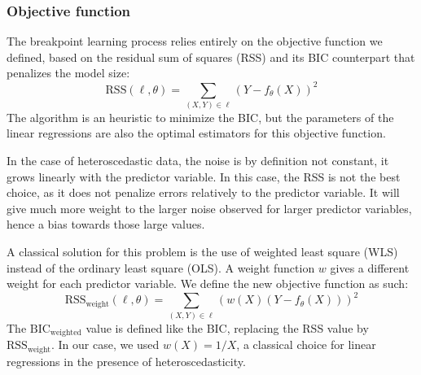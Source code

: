                 \pagebreak

            \subsubsection{Objective function}%
                The breakpoint learning process relies entirely on the objective function we defined, based on the
                residual sum of squares (RSS) and its BIC counterpart that penalizes the model size:
                \begin{equation}
                    \text{RSS}(\ell, \theta) = \sum_{(X,Y)\in\ell} (Y-f_\theta(X))^2
                \end{equation}
                The algorithm is an heuristic to minimize the BIC, but the parameters of the linear regressions are
                also the optimal estimators for this objective function.

                In the case of heteroscedastic data, the noise is by definition not constant, it grows linearly with the
                predictor variable. In this case, the RSS is not the best choice, as it does not penalize errors
                relatively to the predictor variable. It will give much more weight to the larger noise observed for
                larger predictor variables, hence a bias towards those large values.

                A classical solution for this problem is the use of weighted least square (WLS) instead of the ordinary
                least square (OLS). A weight function \(w\) gives a different weight for each predictor variable. We
                define the new objective function as such:
                \begin{equation}
                    \text{RSS}_\text{weight}(\ell,\theta) = \sum_{(X,Y)\in\ell} (w(X)(Y - f_\theta(X)))^2
                \end{equation}
                The \(\text{BIC}_\text{weighted}\) value is defined like the BIC, replacing the RSS value by
                \(\text{RSS}_\text{weight}\).
                In our case, we used \(w(X) = 1/X\), a classical choice for linear regressions in the presence of
                heteroscedasticity.

